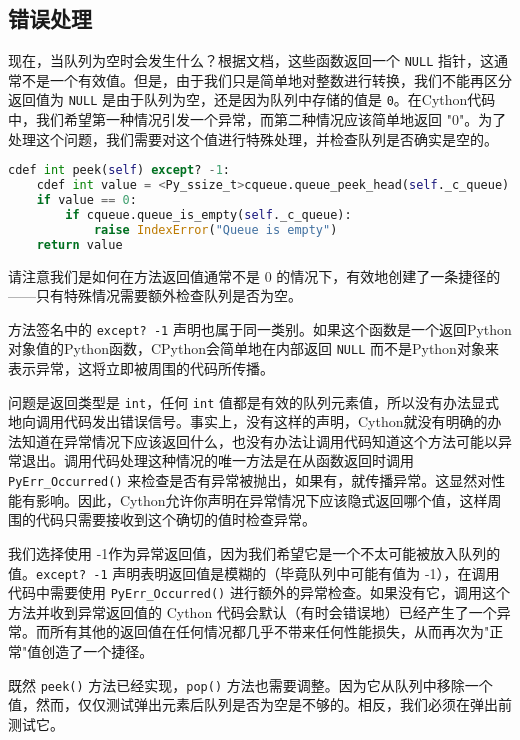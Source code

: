 \begin{translation}
\section{错误处理}

现在，当队列为空时会发生什么？根据文档，这些函数返回一个 \lstinline{NULL} 指针，这通常不是一个有效值。但是，由于我们只是简单地对整数进行转换，我们不能再区分返回值为 \lstinline{NULL} 是由于队列为空，还是因为队列中存储的值是 \lstinline{0}。在Cython代码中，我们希望第一种情况引发一个异常，而第二种情况应该简单地返回 "0"。为了处理这个问题，我们需要对这个值进行特殊处理，并检查队列是否确实是空的。

\begin{framed}
\begin{lstlisting}[language=python]
cdef int peek(self) except? -1:
    cdef int value = <Py_ssize_t>cqueue.queue_peek_head(self._c_queue)
    if value == 0:
        if cqueue.queue_is_empty(self._c_queue):
            raise IndexError("Queue is empty")
    return value
\end{lstlisting}
\end{framed}

请注意我们是如何在方法返回值通常不是 0 的情况下，有效地创建了一条捷径的——只有特殊情况需要额外检查队列是否为空。

方法签名中的 \lstinline{except? -1} 声明也属于同一类别。如果这个函数是一个返回Python对象值的Python函数，CPython会简单地在内部返回 \lstinline{NULL} 而不是Python对象来表示异常，这将立即被周围的代码所传播。

问题是返回类型是 \lstinline{int}，任何 \lstinline{int} 值都是有效的队列元素值，所以没有办法显式地向调用代码发出错误信号。事实上，没有这样的声明，Cython就没有明确的办法知道在异常情况下应该返回什么，也没有办法让调用代码知道这个方法可能以异常退出。调用代码处理这种情况的唯一方法是在从函数返回时调用 \lstinline{PyErr_Occurred()} 来检查是否有异常被抛出，如果有，就传播异常。这显然对性能有影响。因此，Cython允许你声明在异常情况下应该隐式返回哪个值，这样周围的代码只需要接收到这个确切的值时检查异常。

我们选择使用 -1作为异常返回值，因为我们希望它是一个不太可能被放入队列的值。\lstinline{except? -1} 声明表明返回值是模糊的（毕竟队列中可能有值为 -1），在调用代码中需要使用 \lstinline{PyErr_Occurred()} 进行额外的异常检查。如果没有它，调用这个方法并收到异常返回值的 Cython 代码会默认（有时会错误地）已经产生了一个异常。而所有其他的返回值在任何情况都几乎不带来任何性能损失，从而再次为"正常"值创造了一个捷径。

既然 \lstinline{peek()} 方法已经实现，\lstinline{pop()} 方法也需要调整。因为它从队列中移除一个值，然而，仅仅测试弹出元素后队列是否为空是不够的。相反，我们必须在弹出前测试它。


\end{translation}
